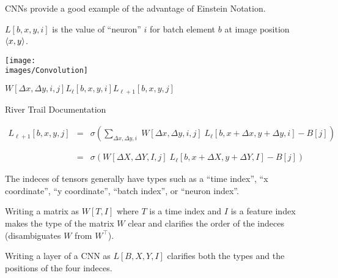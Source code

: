 {


CNNs provide a good example of the advantage of Einstein Notation.

\vfill
{\color{red} $L[b,x,y,i]$} is the value of ``neuron'' $i$ for batch element $b$ at image position ${\mbox{$\langle x,y\rangle$}}$.

\centerline{\texttt{[image: \\images/Convolution]}}
\centerline{$W[\Delta x,\Delta y,i,j]$\hspace{6ex}$L_{{\ell}}[b,x,y,i]$\hspace{6ex}$L_{{\ell+1}}[b,x,y,j]$}
\centerline{\large River Trail Documentation}

{\huge
\begin{eqnarray*}
L_{{\ell+1}}[b,x,y,j] & = & \sigma\left(\sum_{\Delta x,\Delta y,i}\;W[\Delta x, \Delta y, i,j]\; L_{{\ell}}[b,x + \Delta x, y + \Delta y, i] - B[j]\right) \\
\\
\\
& = & \sigma\left(W[\Delta X, \Delta Y, I,j]\; L_{{\ell}}[b,x + \Delta X, y + \Delta Y, I] - B[j]\right)
\end{eqnarray*}
}

The indeces of tensors generally have types such as a ``time index'', ``x coordinate'', ``y coordinate'', ``batch index'', or ``neuron index''.

\vfill
Writing a matrix as $W[T,I]$ where $T$ is a time index and $I$ is a feature index makes the type of the matrix $W$ clear and clarifies
the order of the indeces (disambiguates $W$ from $W^\top$).

\vfill
Writing a layer of a CNN as $L[B,X,Y,I]$ clarifies both the types and the positions of the four indeces.

}


